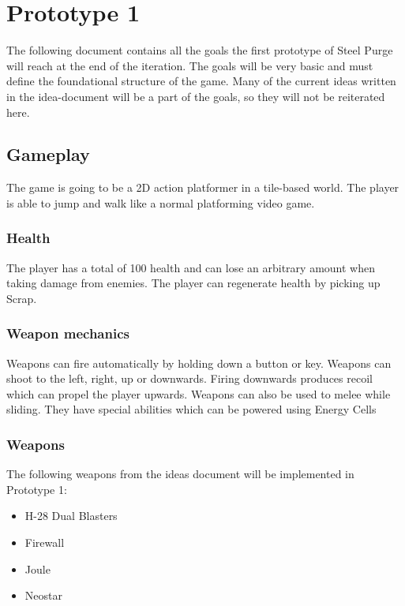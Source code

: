 \documentclass[../Main.tex]{subfiles}
\begin{document}
\section{Prototype 1}

The following document contains all the goals the first prototype of Steel Purge will reach at the end of the iteration. The goals will be very basic and must define the foundational structure of the game. Many of the current ideas written in the idea-document will be a part of the goals, so they will not be reiterated here.

\subsection{Gameplay}

The game is going to be a 2D action platformer in a tile-based world. The player is able to jump and walk like a normal platforming video game.

\subsubsection{Health}

The player has a total of 100 health and can lose an arbitrary amount when taking damage from enemies. The player can regenerate health by picking up Scrap.

\subsubsection{Weapon mechanics}

Weapons can fire automatically by holding down a button or key. Weapons can shoot to the left, right, up or downwards. Firing downwards produces recoil which can propel the player upwards. Weapons can also be used to melee while sliding. They have special abilities which can be powered using Energy Cells

\subsubsection{Weapons}

The following weapons from the ideas document will be implemented in Prototype 1:

\begin{itemize}
	\item H-28 Dual Blasters
	\item Firewall
	\item Joule
	\item Neostar
\end{itemize}
\end{document}
